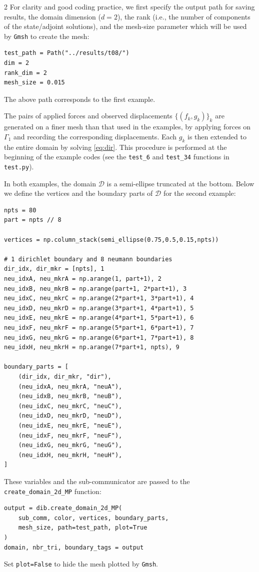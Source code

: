 \documentclass[a4paper, oneside]{article}
\newcommand{\code}[1]{\texttt{#1}}
\begin{document}
\begin{multicols}{2}
For clarity and good coding practice, we first specify
the output path for saving results,
the domain dimension ($d=2$),
the rank (i.e., the number of components of the state/adjoint solutions),
and the mesh-size parameter which will be used by \code{Gmsh} to create the mesh:
\begin{lstlisting}
test_path = Path("../results/t08/")
dim = 2
rank_dim = 2
mesh_size = 0.015
\end{lstlisting}
The above path corresponds to the first example.

The pairs of applied forces and observed displacements $\{(f_k,g_k)\}_k$
are generated on a finer mesh than that used in the examples,
by applying forces on $\Gamma_1$ and recording the corresponding displacements.
Each $g_k$ is then extended to the entire domain by solving \eqref{eq:dir}.
This procedure is performed at the beginning of the example codes
(see the \code{test\_6} and \code{test\_34} functions in \code{test.py}).


In both examples, the domain $\mathcal{D}$ is a semi-ellipse truncated at the bottom.
Below we define the vertices and the boundary parts of $\mathcal{D}$ for the second example:
\begin{minipage}{\linewidth}
\begin{lstlisting}
npts = 80
part = npts // 8

vertices = np.column_stack(semi_ellipse(0.75,0.5,0.15,npts))

# 1 dirichlet boundary and 8 neumann boundaries
dir_idx, dir_mkr = [npts], 1
neu_idxA, neu_mkrA = np.arange(1, part+1), 2
neu_idxB, neu_mkrB = np.arange(part+1, 2*part+1), 3
neu_idxC, neu_mkrC = np.arange(2*part+1, 3*part+1), 4
neu_idxD, neu_mkrD = np.arange(3*part+1, 4*part+1), 5
neu_idxE, neu_mkrE = np.arange(4*part+1, 5*part+1), 6
neu_idxF, neu_mkrF = np.arange(5*part+1, 6*part+1), 7
neu_idxG, neu_mkrG = np.arange(6*part+1, 7*part+1), 8
neu_idxH, neu_mkrH = np.arange(7*part+1, npts), 9

boundary_parts = [
	(dir_idx, dir_mkr, "dir"),
	(neu_idxA, neu_mkrA, "neuA"),
	(neu_idxB, neu_mkrB, "neuB"),
	(neu_idxC, neu_mkrC, "neuC"),
	(neu_idxD, neu_mkrD, "neuD"),
	(neu_idxE, neu_mkrE, "neuE"),
	(neu_idxF, neu_mkrF, "neuF"),
	(neu_idxG, neu_mkrG, "neuG"),
	(neu_idxH, neu_mkrH, "neuH"),
]
\end{lstlisting}
\end{minipage}

These variables and the sub-communicator are passed to
the \code{create\_domain\_2d\_MP} function:
\begin{lstlisting}
output = dib.create_domain_2d_MP(
	sub_comm, color, vertices, boundary_parts,
	mesh_size, path=test_path, plot=True
)
domain, nbr_tri, boundary_tags = output	
\end{lstlisting}
Set \code{plot=False} to hide the mesh plotted by \code{Gmsh}.


\end{multicols}
\end{document}
